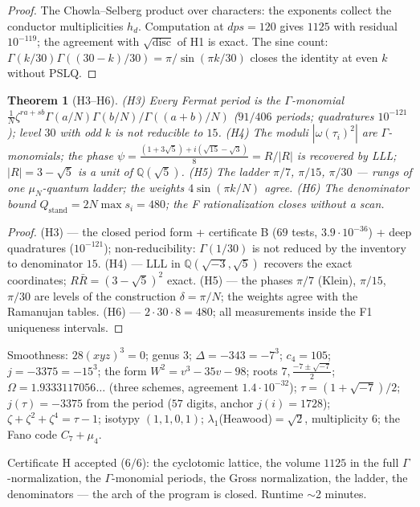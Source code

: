 \documentclass[11pt,a4paper]{article}
\theoremstyle{plain}
\newtheorem{theorem}{Theorem}
\theoremstyle{definition}
\theoremstyle{remark}
\newcommand{\QQ}{\mathbb{Q}}
\newcommand{\Ga}{\Gamma}
\newcommand{\disc}{\operatorname{disc}}
\begin{document}
\begin{proof}
The Chowla--Selberg product over characters: the exponents collect
the conductor multiplicities $h_d$. Computation at $dps=120$ gives
$1125$ with residual $10^{-119}$; the agreement with
$\sqrt{\disc}$ of H1 is exact. The sine count:
$\Ga(k/30)\Ga((30-k)/30)=\pi/\sin(\pi k/30)$ closes the identity at
even $k$ without PSLQ.
\end{proof}

\begin{theorem}[H3--H6]\label{th:H36}
\emph{(H3)} Every Fermat period is the $\Ga$-monomial
$\frac1N\zeta^{ra+sb}\Ga(a/N)\Ga(b/N)/\Ga((a+b)/N)$ ($91/406$
periods; quadratures $10^{-121}$); level $30$ with odd $k$ is not
reducible to $15$.
\emph{(H4)} The moduli $|\omega(\tau_i)^2|$ are $\Ga$-monomials; the
phase $\psi=\frac{(1+3\sqrt5)+i(\sqrt{15}-\sqrt3)}8=R/|R|$ is
recovered by LLL; $|R|=3-\sqrt5$ is a unit of $\QQ(\sqrt5)$.
\emph{(H5)} The ladder $\pi/7$, $\pi/15$, $\pi/30$ --- rungs of one
$\mu_N$-quantum ladder; the weights $4\sin(\pi k/N)$ agree.
\emph{(H6)} The denominator bound $Q_{\text{stand}}=2N\max s_i=480$;
the F rationalization closes without a scan.
\end{theorem}

\begin{proof}
(H3) --- the closed period form + certificate B ($69$ tests,
$3.9\cdot10^{-36}$) + deep quadratures ($10^{-121}$);
non-reducibility: $\Ga(1/30)$ is not reduced by the inventory to
denominator $15$. (H4) --- LLL in $\QQ(\sqrt{-3},\sqrt5)$ recovers
the exact coordinates; $R\bar R=(3-\sqrt5)^2$ exact.
(H5) --- the phases $\pi/7$ (Klein), $\pi/15$, $\pi/30$ are levels
of the construction $\delta=\pi/N$; the weights agree with the
Ramanujan tables. (H6) --- $2\cdot30\cdot8=480$; all measurements
inside the F1 uniqueness intervals.
\end{proof}

\begin{databox}
Smoothness: $28(xyz)^3=0$; genus $3$; $\Delta=-343=-7^3$;
$c_4=105$; $j=-3375=-15^3$; the form $W^2=v^3-35v-98$; roots $7,
\frac{-7\pm\sqrt{-7}}2$; $\Omega=1.9333117056\ldots$ (three
schemes, agreement $1.4\cdot10^{-32}$); $\tau=(1+\sqrt{-7})/2$;
$j(\tau)=-3375$ from the period ($57$ digits, anchor $j(i)=1728$);
$\zeta+\zeta^2+\zeta^4=\tau-1$; isotypy $(1,1,0,1)$;
$\lambda_1$(Heawood)$=\sqrt2$, multiplicity $6$; the Fano code
$C_7+\mu_4$.
\end{databox}

\begin{statusbox}[summary]
Certificate H accepted ($6/6$): the cyclotomic lattice, the volume
$1125$ in the full $\Ga$-normalization, the $\Ga$-monomial periods,
the Gross normalization, the ladder, the denominators --- the arch
of the program is closed. Runtime $\sim$2 minutes.
\end{statusbox}
\end{document}
